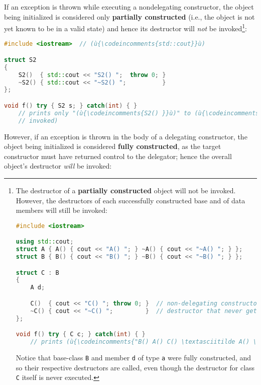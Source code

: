 \noindent If an exception is thrown while executing a nondelegating constructor,
the object being initialized is considered only \textbf{partially
constructed} (i.e., the object is not yet known to be in a valid state)
and hence its destructor will \emph{not} be
invoked{\cprotect\footnote{The destructor of a \textbf{partially
constructed} object will not be invoked. However, the destructors of
each successfully constructed base and of data members will still be
invoked:

\begin{lstlisting}[language=C++, basicstyle={\ttfamily\footnotesize}]
#include <iostream>

using std::cout;
struct A { A() { cout << "A() "; } ~A() { cout << "~A() "; } };
struct B { B() { cout << "B() "; } ~B() { cout << "~B() "; } };

struct C : B
{
    A d;

    C()  { cout << "C() "; throw 0; }  // non-delegating constructor that throws
    ~C() { cout << "~C() ";         }  // destructor that never gets called
};

void f() try { C c; } catch(int) { }
    // prints (ù{\codeincomments{"B() A() C() \textasciitilde A() \textasciitilde B()"}}ù) to (ù{\codeincomments{stdout}}ù)
\end{lstlisting}

\noindent Notice that base-class \texttt{B} and member \texttt{d} of type
\texttt{a} were fully constructed, and so their respective destructors
are called, even though the destructor for class \texttt{C} itself is
  never executed.}}:

\begin{lstlisting}[language=C++]
#include <iostream>  // (ù{\codeincomments{std::cout}}ù)

struct S2
{
    S2()  { std::cout << "S2() ";  throw 0; }
    ~S2() { std::cout << "~S2() ";          }
};

void f() try { S2 s; } catch(int) { }
    // prints only "(ù{\codeincomments{S2() }}ù)" to (ù{\codeincomments{stdout}}ù) (i.e., the destructor of (ù{\codeincomments{S2}}ù) is never
    // invoked)
\end{lstlisting}

\noindent However, if an exception is thrown in the body of a delegating
constructor, the object being initialized is considered \textbf{fully
constructed}, as the target constructor must have returned control to
the delegator; hence the overall object's destructor \emph{will} be
invoked:

